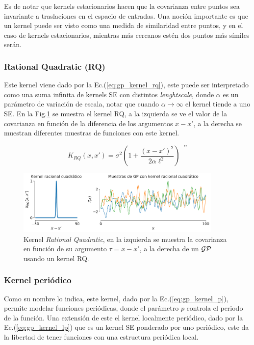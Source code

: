 Es de notar que kernels estacionarios hacen que la covarianza entre puntos sea invariante a traslaciones en el espacio de entradas. Una noción importante es que un kernel puede ser visto como una medida de similaridad entre puntos, y en el caso de kernels estacionarios, mientras más cercanos estén dos puntos más símiles serán.

\subsubsection{Rational Quadratic (RQ)}

Este kernel viene dado por la Ec.(\ref{eq:gp_kernel_rq}), este puede ser interpretado como una suma infinita de kernels SE con distintos \textit{lenghtscale}, donde $\alpha$ es un parámetro de variación de escala, notar que cuando $\alpha \rightarrow \infty$ el kernel tiende a uno SE. En la Fig.\ref{fig:gp_6} se muestra el kernel RQ, a la izquierda se ve el valor de la covarianza en función de la diferencia de los argumentos $x-x'$, a la derecha se muestran diferentes muestras de funciones con este kernel.
 
\begin{equation}\label{eq:gp_kernel_rq}
	K_{RQ}(x, x') = \sigma^2 \left(1 + \frac{\left( x- x'\right)^2}{2\alpha\ell^2 } \right)^{-\alpha}
\end{equation}


\begin{figure}[H]
	\centering
	\includegraphics[width=0.9\textwidth]{img/cap8_muestras_RQ}
	\caption{Kernel \textit{Rational Quadratic}, en la izquierda se muestra la covarianza en función de su argumento $\tau=x-x'$, a la derecha de un $\mathcal{GP}$ usando un kernel RQ.}
	\label{fig:gp_6}
\end{figure}

\subsubsection{Kernel periódico}

Como su nombre lo indica, este kernel, dado por la Ec.(\ref{eq:gp_kernel_p}), permite modelar funciones periódicas, donde el parámetro $p$ controla el periodo de la función. Una extensión de este el kernel localmente periódico, dado por la Ec.(\ref{eq:gp_kernel_lp}) que es un kernel SE ponderado por uno periódico, este da la libertad de tener funciones con una estructura periódica local.


